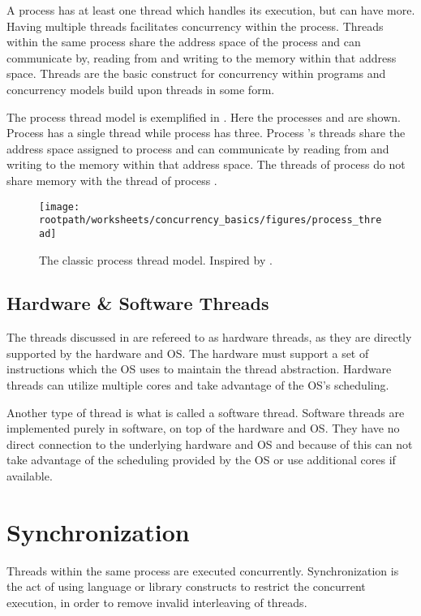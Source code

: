 A process has at least one thread which handles its execution, but can have more. Having multiple threads facilitates concurrency within the process. Threads within the same process share the address space of the process and can communicate by, reading from and writing to the memory within that address space. Threads are the basic construct for concurrency within programs and concurrency models build upon threads in some form.

The process thread model is exemplified in . Here the processes  and  are shown. Process  has a single thread while process  has three. Process 's threads share the address space assigned to process  and can communicate by reading from and writing to the memory within that address space. The threads of process  do not share memory with the thread of process .

\begin{figure}[htbp]
\centering
 \texttt{[image: \\rootpath/worksheets/concurrency\_basics/figures/process\_thread]} 
 \caption{The classic process thread model. Inspired by \cite[p. 99]{tanenbaum2008modern}.}
\label{fig:classic_process_thread}
\end{figure}


\subsection{Hardware \& Software Threads}
The threads discussed in  are refereed to as hardware threads, as they are directly supported by the hardware and \ac{OS}. The hardware must support a set of instructions which the \ac{OS} uses to maintain the thread abstraction. Hardware threads can utilize multiple cores and take advantage of the \ac{OS}'s scheduling.

Another type of thread is what is called a software thread. Software threads are implemented purely in software, on top of the hardware and \ac{OS}. They have no direct connection to the underlying hardware and \ac{OS} and because of this can not take advantage of the scheduling provided by the \ac{OS} or use additional cores if available. 

\section{Synchronization}\label{sec:synchronization}
Threads within the same process are executed concurrently. Synchronization is the act of using language or library constructs to restrict the concurrent execution, in order to remove invalid interleaving of threads\cite[p. 1989]{scott2011sync}.

